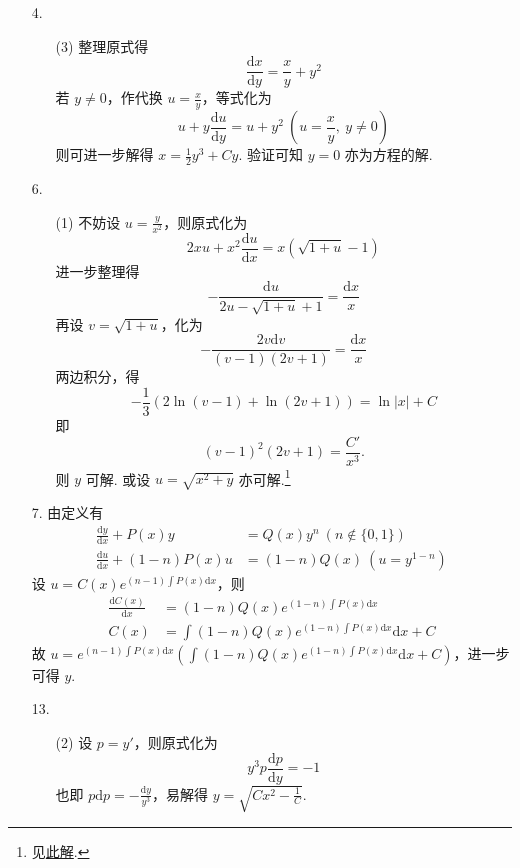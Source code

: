 \documentclass[11pt,oneside,fontset=fandol]{ctexbook} %
\begin{document}
\begin{enumerate}
    \item[4.]
    \begin{enumerate}
        \item[(3)]
        整理原式得
        \[
            \frac{\mathrm dx}{\mathrm dy} = \frac x y + y^2
        \]
        若 $y \neq 0$，作代换 $u = \frac x y$，等式化为
        \[
            u + y \frac{\mathrm du}{\mathrm dy} = u + y^2 \ \left( u = \frac x y,\ y \neq 0 \right)
        \]
        则可进一步解得 $x = \frac 1 2 y^3 + Cy$. 验证可知 $y = 0$ 亦为方程的解.
    \end{enumerate}
    \item[6.]
    \begin{enumerate}
        \item[(1)]
        不妨设 $u = \frac y {x^2}$，则原式化为
        \[
            2xu + x^2 \frac{\mathrm du}{\mathrm dx} = x \left( \sqrt{1+u} - 1 \right)
        \]
        进一步整理得
        \[
            - \frac{\mathrm du}{2u - \sqrt{1+u} + 1} = \frac {\mathrm dx} x
        \]
        再设 $v = \sqrt{1+u}$，化为
        \[
            - \frac{2v \mathrm dv}{(v-1)(2v+1)} = \frac {\mathrm dx} x
        \]
        两边积分，得
        \[
            -\frac 1 3 \left( 2 \ln(v-1) + \ln(2v+1) \right) = \ln|x| + C
        \]
        即
        \[
        (v-1)^2(2v+1) = \frac{C'}{x^3}.
        \]
        则 $y$ 可解. 或设 $u = \sqrt{x^2 + y}$ 亦可解.\footnote{见\href{https://math.stackexchange.com/questions/3374263/how-to-solve-the-following-ordinary-differential-equation}{此解}.}
    \end{enumerate}
    \item[7.]
    由定义有
    \begin{align*}
        \frac{\mathrm dy}{\mathrm dx} + P(x) y &= Q(x) y^n \ (n \not\in \{ 0, 1 \} ) \\
        \frac{\mathrm du}{\mathrm dx} + (1-n) P(x) u &= (1-n) Q(x) \ (u = y^{1-n})
    \end{align*}
    设 $u = C(x) e^{(n-1) \int P(x) \mathrm dx}$，则
    \begin{align*}
        \frac{\mathrm d C(x)}{\mathrm dx} &= (1-n)Q(x)e^{(1-n) \int P(x) \mathrm dx} \\
        C(x) &= \int (1-n)Q(x)e^{(1-n) \int P(x) \mathrm dx} \mathrm dx + C
    \end{align*}
    故 $u = e^{(n-1) \int P(x) \mathrm dx} \left( \int (1-n)Q(x)e^{(1-n) \int P(x) \mathrm dx} \mathrm dx + C \right)$，进一步可得 $y$.
    \item[13.]
    \begin{enumerate}
        \item[(2)]
        设 $p = y'$，则原式化为
        \[
            y^3 p \frac{\mathrm dp}{\mathrm dy} = -1
        \]
        也即 $p \mathrm dp = - \frac{\mathrm dy}{y^3}$，易解得 $y = \sqrt{Cx^2 - \frac 1 C}$.
    \end{enumerate}
\end{enumerate}
\end{document}
